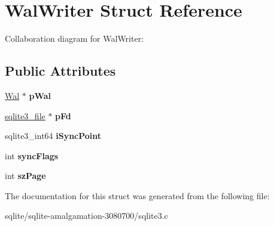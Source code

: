 \hypertarget{struct_wal_writer}{\section{Wal\+Writer Struct Reference}
\label{struct_wal_writer}
}


Collaboration diagram for Wal\+Writer\+:
\subsection*{Public Attributes}
\begin{DoxyCompactItemize}
\item 
\hypertarget{struct_wal_writer_a3ed1cabab4a2f0572ec04d2a174e5bf9}{\hyperlink{struct_wal}{Wal} $\ast$ {\bfseries p\+Wal}}\label{struct_wal_writer_a3ed1cabab4a2f0572ec04d2a174e5bf9}

\item 
\hypertarget{struct_wal_writer_a0c98cddd084b97d9f531fa71b92ef40a}{\hyperlink{structsqlite3__file}{sqlite3\+\_\+file} $\ast$ {\bfseries p\+Fd}}\label{struct_wal_writer_a0c98cddd084b97d9f531fa71b92ef40a}

\item 
\hypertarget{struct_wal_writer_a1227aea1e12b6b409e8a7cdbae43588e}{sqlite3\+\_\+int64 {\bfseries i\+Sync\+Point}}\label{struct_wal_writer_a1227aea1e12b6b409e8a7cdbae43588e}

\item 
\hypertarget{struct_wal_writer_acc8dcbdc9b91bae4799b5de113742ae6}{int {\bfseries sync\+Flags}}\label{struct_wal_writer_acc8dcbdc9b91bae4799b5de113742ae6}

\item 
\hypertarget{struct_wal_writer_aa161832c97830aed52410747ebde5e6e}{int {\bfseries sz\+Page}}\label{struct_wal_writer_aa161832c97830aed52410747ebde5e6e}

\end{DoxyCompactItemize}


The documentation for this struct was generated from the following file\+:\begin{DoxyCompactItemize}
\item 
sqlite/sqlite-\/amalgamation-\/3080700/sqlite3.\+c\end{DoxyCompactItemize}
